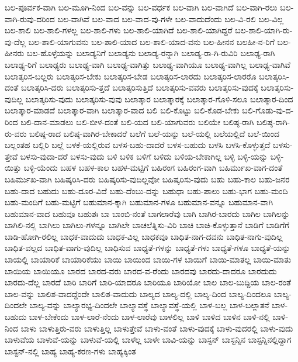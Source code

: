 {ಬಲ-ಪೂರ್ವಕ-ವಾಗಿ
ಬಲ-ಮೂಗಿ-ನಿಂದ
ಬಲ-ವನ್ನು
ಬಲ-ವರ್ಧಕ
ಬಲ-ವಾಗಿ
ಬಲ-ವಾಗಿದೆ
ಬಲ-ವಾಗಿ-ರಲು
ಬಲ-ವಾಗಿ-ರುವು-ದರಿಂದ
ಬಲ-ವಾಗಿವೆ
ಬಲ-ವಾದ
ಬಲ-ವಾದ-ವು-ಗಳೇ
ಬಲ-ವಾದುದೆಂದು
ಬಲ-ವಿ-ರಲಿ
ಬಲ-ವಿಲ್ಲ
ಬಲ-ಶಾಲಿ
ಬಲ-ಶಾಲಿ-ಗಳಲ್ಲ
ಬಲ-ಶಾಲಿ-ಗಳು
ಬಲ-ಶಾಲಿ-ಯಾಗಿದೆ
ಬಲ-ಶಾಲಿ-ಯಾಗಿದ್ದರೆ
ಬಲ-ಶಾಲಿ-ಯಾಗಿ-ರು-ವು-ದೆಲ್ಲ
ಬಲ-ಶಾಲಿ-ಯಾಗುವನು
ಬಲ-ಶಾಲಿ-ಯಾದ
ಬಲ-ಶಾಲಿ-ಯಾದ-ವನು
ಬಲ-ಹೀನನ
ಬಲಹೀ-ನ-ರಿಗೆ
ಬಲ-ಹೀನರು
ಬಲ-ಹೊಳ್ಳೆಯನ್ನು
ಬಲಾಡ್ಯನಿಗೆ
ಬಲಾಡ್ಯನು
ಬಲಾಡ್ಯ-ರನ್ನಾಗಿ
ಬಲಾಡ್ಯ-ರಾ-ಗಿ-ರುವಿರಿ
ಬಲಾಢ್ಯ-ರಾಗಿ
ಬಲಾಢ್ಯ-ರಿಗೆ
ಬಲಾಢ್ಯರು
ಬಲಾಢ್ಯ-ವಾಗಿ
ಬಲಾಢ್ಯ-ವಾಗಿತ್ತು
ಬಲಾಢ್ಯ-ವಾಗಿಯೂ
ಬಲಾಢ್ಯ-ವಾಗಿಲ್ಲ
ಬಲಾಢ್ಯ-ವಾಗಿವೆ
ಬಲಾತ್ಕರಿಸ-ಬಲ್ಲರು
ಬಲಾತ್ಕರಿಸ-ಬೇಕು
ಬಲಾತ್ಕರಿಸ-ಬೇಡ
ಬಲಾತ್ಕರಿಸ-ಲಾರದು
ಬಲಾತ್ಕರಿಸ-ಲಾರರೊ
ಬಲಾತ್ಕರಿಸಿ-ದಂತೆ
ಬಲಾತ್ಕರಿಸಿ-ದರು
ಬಲಾತ್ಕರಿಸು-ತ್ತದೆ
ಬಲಾತ್ಕರಿಸುತ್ತಿದೆ
ಬಲಾತ್ಕರಿಸು-ವವರು
ಬಲಾತ್ಕರಿಸು-ವುದಕ್ಕೆ
ಬಲಾತ್ಕರಿಸು-ವುದಿಲ್ಲ
ಬಲಾತ್ಕರಿಸು-ವುದು
ಬಲಾತ್ಕರಿಸು-ವುವು
ಬಲಾತ್ಕಾರ
ಬಲಾತ್ಕಾರಕ್ಕೆ
ಬಲಾತ್ಕಾರ-ಗೊಳಿ-ಸಲೂ
ಬಲಾತ್ಕಾರ-ದಿಂದ
ಬಲಾತ್ಕಾರ-ಮಾಡದೆ
ಬಲಾತ್ಕಾರ-ವಾಗಿ
ಬಲಾತ್ಕಾರ-ವಾದ
ಬಲಿ
ಬಲಿ-ಕೊಟ್ಟು
ಬಲಿ-ಕೊಡ-ಬೇಕು
ಬಲಿ-ಗೊಡು-ವು-ದ-ರಿಂದ
ಬಲಿ-ದಾನ-ಮಾಡಲು
ಬಲಿ-ಬೀಳ-ದಂತೆ
ಬಲಿ-ಯದ
ಬಲಿ-ಯಾಗುವರು
ಬಲಿಯೇ
ಬಲಿಷ್ಠ-ರಾಗಿ
ಬಲಿಷ್ಠ-ರಾಗಿ-ರು-ವರು
ಬಲಿಷ್ಠ-ರಾದ
ಬಲಿಷ್ಠ-ವಾಗಿರ-ಬೇಕಾದರೆ
ಬಲೆಗೆ
ಬಲೆ-ಯನ್ನು
ಬಲೆ-ಯಲ್ಲಿ
ಬಲೆಯಲ್ಲಿದೆ
ಬಲೆ-ಯಿಂದ
ಬಲ್ಲಂತಹ
ಬಲ್ಲಿರಿ
ಬಲ್ಲೆ
ಬಳಕೆ-ಯಲ್ಲಿರುವ
ಬಳಸ-ಬಹು-ದಾದರೆ
ಬಳಸ-ಬಹುದು
ಬಳಸಿ
ಬಳಸಿ-ಕೊಳ್ಳುತ್ತದೆ
ಬಳಸು-ತ್ತೇವೆ
ಬಳಸು-ವುದಾ-ದರೆ
ಬಳಸು-ವುದು
ಬಳಿ
ಬಳಿಕ
ಬಳಿಗೆ
ಬಳಿದು
ಬಳಿಯ-ಬೇಕಾಗಿಲ್ಲ
ಬಳ್ಳಿ
ಬಳ್ಳಿ-ಯನ್ನು
ಬಳ್ಳಿ-ಯಿತ್ತು
ಬಳ್ಳಿ-ಯೆಂದು
ಬಹಳ
ಬಹಳ-ಕಾಲ
ಬಹಳ-ಮಟ್ಟಿಗೆ
ಬಹಿರಂಗ
ಬಹಿರಂಗ-ವಾಗಿ
ಬಹಿರ್ಮುಖ-ವಾಗ-ದಂತೆ
ಬಹಿರ್ಮುಖ-ವಾಗಿ
ಬಹಿಷ್ಕರಿಸಿ-ದರು
ಬಹಿಷ್ಕರಿಸು-ವುದಿಲ್ಲವೋ
ಬಹಿಷ್ಕರಿಸು-ವುದು
ಬಹು
ಬಹು-ಕಾಲ
ಬಹು-ಜನರ
ಬಹು-ದಾದ
ಬಹುದು
ಬಹು-ದೂರ-ವಿದೆ
ಬಹು-ದೆಂಬು-ದನ್ನು
ಬಹುಧಾ
ಬಹು-ಪಾಲು
ಬಹು-ಭಾಗ
ಬಹು-ಮಂದಿ
ಬಹು-ಮಂದಿಗೆ
ಬಹು-ಮಟ್ಟಿಗೆ
ಬಹುಮಾನ-ಕ್ಕಾಗಿ
ಬಹುಮಾನ-ಗಳೂ
ಬಹುಮಾನ-ವನ್ನೂ
ಬಹುಮಾನ-ವಾಗಿ
ಬಹುಮಾನ-ವಾದ
ಬಹುವೂ
ಬಹುಶಃ
ಬಾ
ಬಾಂಬಿ-ನಂತೆ
ಬಾಗಲಾರೆವು
ಬಾಗಿ
ಬಾಗಿರ-ಬಾರದು
ಬಾಗಿಲ
ಬಾಗಿಲನ್ನು
ಬಾಗಿಲಿ-ನಲ್ಲಿ
ಬಾಗಿಲು
ಬಾಗಿಲು-ಗಳನ್ನೂ
ಬಾಗಿಲೇ
ಬಾಚಲೆತ್ನಿಸು-ವಿರಿ
ಬಾಚಿ
ಬಾಚಿ-ಕೊಳ್ಳುತ್ತಾನೆ
ಬಾಡಿಗೆ
ಬಾಡಿಗೆಗೆ
ಬಾಡಿ-ಹೋಗಿ-ರಲಿಲ್ಲ
ಬಾಧಕ-ವಾದುದು
ಬಾಧಕ-ವಿಲ್ಲ
ಬಾಧಕವೂ
ಬಾಧಿತ-ನಾಗ-ದವನು
ಬಾಧಿತ-ನಾಗು-ವುದಿಲ್ಲ
ಬಾಧಿತ-ವಲ್ಲದ
ಬಾಧಿತ-ವಾಗು-ವುದಿಲ್ಲ
ಬಾಧಿಸುವ
ಬಾಧ್ಯತೆ-ಗಳನ್ನು
ಬಾಧ್ಯತೆ-ಗಳು
ಬಾಧ್ಯತೆ-ಗಳೂ
ಬಾಧ್ಯತೆ-ಯನ್ನು
ಬಾಯಲ್ಲಿ
ಬಾಯಾರಿಕೆ
ಬಾಯಾರಿಕೆಯು
ಬಾಯಿ
ಬಾಯಿಂದ
ಬಾಯಿ-ಗಳ
ಬಾಯಿಗೆ
ಬಾಯಿ-ಮಾತಲ್ಲ
ಬಾಯಿ-ಮಾತು
ಬಾಯಿಯ
ಬಾಯಿಯೂ
ಬಾರದ
ಬಾರದ-ವರು
ಬಾರದ-ವ-ರೆಂದು
ಬಾರದವು
ಬಾರದು-ದಾದರೂ
ಬಾರದುದು
ಬಾರದು-ದೆಲ್ಲ
ಬಾರದೆ
ಬಾರಿ
ಬಾರಿಗೆ
ಬಾರಿ-ಯಾದರೂ
ಬಾರಿಯೂ
ಬಾರಿಯೋ
ಬಾಲ
ಬಾಲ-ಬುದ್ದಿಯ
ಬಾಲ-ರಂತೆ
ಬಾಲ-ವನ್ನು
ಬಾಲಿಶ-ವಾದದ್ದೆಂದೇ
ಬಾಲಿಶ-ವಾದುದು
ಬಾಲ್ಯದ
ಬಾಲ್ಯ-ದಲ್ಲಿ
ಬಾಲ್ಯ-ದಿಂದ
ಬಾಲ್ಯ-ದಿಂದಲೂ
ಬಾಲ್ಯ-ದಿಂದಲೇ
ಬಾಲ್ಯ-ವನ್ನು
ಬಾಲ್ಯಾರಭ್ಯ-ದಿಂದಲೇ
ಬಾಲ್ಯಾವಸ್ಥೆ
ಬಾಲ್ಯಾವಸ್ಥೆ-ಯಲ್ಲಿ
ಬಾಳ-ಬಲ್ಲ
ಬಾಳ-ಬಲ್ಲಾತನೆ
ಬಾಳ-ಬಹುದು
ಬಾಳ-ಬೇಕೆಂದು
ಬಾಳ-ಲಾರೆ-ನೆಂದು
ಬಾಳ-ಲಾರೆವು
ಬಾಳಲಿಲ್ಲ
ಬಾಳಿ
ಬಾಳಿದ
ಬಾಳಿನ
ಬಾಳಿ-ನಲ್ಲಿ
ಬಾಳಿ-ನಿಂದ
ಬಾಳು
ಬಾಳುತ್ತಿರು-ವರು
ಬಾಳುತ್ತಿಲ್ಲ
ಬಾಳುತ್ತೇವೆ
ಬಾಳು-ವಂತೆ
ಬಾಳು-ವುದಕ್ಕೆ
ಬಾಳು-ವುದರಲ್ಲಿ
ಬಾಳು-ವುದು
ಬಾಳುವೆಯ
ಬಾಳುವೆ-ಯನ್ನು
ಬಾಳುವೆ-ಯಲ್ಲಿ
ಬಾಳೆಲ್ಲ
ಬಾಳೇ
ಬಾವಿ-ಯನ್ನು
ಬಾಸ್ಟನ್
ಬಾಸ್ಟನ್ನಿನ
ಬಾಸ್ಟನ್ನಿನಲ್ಲಿದ್ದಾಗ
ಬಾಸ್ಟನ್-ನಲ್ಲಿ
ಬಾಹ್ಯ
ಬಾಹ್ಯ-ಕರಣ-ಗಳು
ಬಾಹ್ಯಕ್ಕಿಂತ
}

